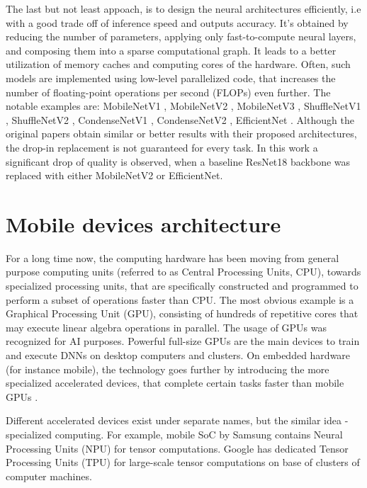 The last but not least appoach, is to design the neural architectures efficiently, i.e with a good trade off of inference speed and outputs accuracy. It's obtained by reducing the number of parameters, applying only fast-to-compute neural layers, and composing them into a sparse computational graph. It leads to a better utilization of memory caches and computing cores of the hardware. Often, such models are implemented using low-level parallelized code, that increases the number of floating-point operations per second (FLOPs) even further. The notable examples are: MobileNetV1 \cite{dnn:mnv1-17}, MobileNetV2 \cite{dnn:mnv2-18}, MobileNetV3 \cite{dnn:mnv3-19},  ShuffleNetV1 \cite{dnn:shufflenetv1-18}, ShuffleNetV2 \cite{dnn:shufflenetv2-18}, CondenseNetV1 \cite{dnn:condensenetv1-18}, CondenseNetV2 \cite{dnn:condensenetv2-21}, EfficientNet \cite{dnn:efficientnetv1-19}. Although the original papers obtain similar or better results with their proposed architectures, the drop-in replacement is not guaranteed for every task. In this work a significant drop of quality is observed, when a baseline ResNet18 backbone was replaced with either MobileNetV2 or EfficientNet.

%

\section{Mobile devices architecture}
\label{lit:mobile}

For a long time now, the computing hardware has been moving from general purpose computing units (referred to as Central Processing Units, CPU), towards specialized processing units, that are specifically constructed and programmed to perform a subset of operations faster than CPU. The most obvious example is a Graphical Processing Unit (GPU), consisting of hundreds of repetitive cores that may execute linear algebra operations in parallel. The usage of GPUs was recognized for AI purposes. Powerful full-size GPUs are the main devices to train and execute DNNs on desktop computers and clusters. On embedded hardware (for instance mobile), the technology goes further by introducing the more specialized accelerated devices, that complete certain tasks faster than mobile GPUs \cite{mobile:dl-review19}.

Different accelerated devices exist under separate names, but the similar idea - specialized computing. For example, mobile SoC by Samsung contains Neural Processing Units (NPU) for tensor computations. Google has dedicated Tensor Processing Units (TPU) for large-scale tensor computations on base of clusters of computer machines.


